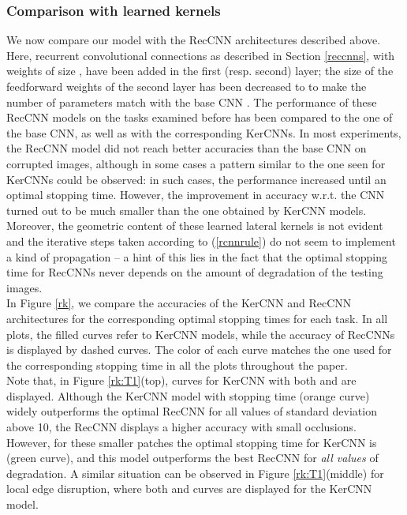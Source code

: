 \documentclass[11pt,oneside,reqno]{amsart}
\begin{document}
 \subsubsection{Comparison with learned kernels}\label{cfr}
 We now compare our model with the RecCNN architectures described above. Here, recurrent convolutional connections as described in Section \ref{reccnns}, with weights  of size , have been added in the first (resp. second) layer; the size of the feedforward weights of the second layer has been decreased to  to make the number of parameters match with the base CNN \citep[as in][]{spoerer}. The performance of these RecCNN models on the tasks examined before has been compared to the one of the base CNN, as well as with the corresponding KerCNNs. In most experiments, the RecCNN model did not reach better accuracies than the base CNN on corrupted images, although in some cases a pattern similar to the one seen for KerCNNs could be observed: in such cases, the performance increased until an optimal stopping time. However, the improvement in accuracy w.r.t. the CNN turned out to be much smaller than the one obtained by KerCNN models. Moreover, the geometric content of these learned lateral kernels is not evident and the iterative steps taken according to (\ref{rcnnrule}) do not seem to implement a kind of propagation -- a hint of this lies in the fact that the optimal stopping time for RecCNNs never depends on the amount of degradation of the testing images.\\
 In Figure \ref{rk}, we compare the accuracies of the KerCNN and RecCNN architectures for the corresponding optimal stopping times for each task. In all plots, the filled curves refer to KerCNN models, while the accuracy of RecCNNs is displayed by dashed curves. The color of each curve matches the one used for the corresponding stopping time in all the plots throughout the paper.\\
 Note that, in Figure \ref{rk:T1}(top), curves for KerCNN with both  and  are displayed. Although the KerCNN model with stopping time  (orange curve) widely outperforms the optimal RecCNN for all values of standard deviation above 10, the RecCNN displays a higher accuracy with small occlusions. However, for these smaller patches the optimal stopping time for KerCNN is  (green curve), and this model outperforms the best RecCNN for \emph{all values} of degradation. A similar situation can be observed in Figure \ref{rk:T1}(middle) for local edge disruption, where  both  and  curves are displayed for the KerCNN model.\\
\end{document}
